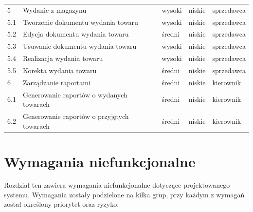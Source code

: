 \begin{table}[ht]
\begin{center}
\begin{tabular}{| l | l | l | l | l |}
		   	5 & Wydanie z magazynu & wysoki & niskie & sprzedawca \\
		   	5.1 & Tworzenie dokumentu wydania towaru & wysoki & niskie & sprzedawca \\
		   	5.2 & Edycja dokumentu wydania towaru & średni & niskie & sprzedawca \\
		   	5.3 & Usuwanie dokumentu wydania towaru & wysoki & niskie & sprzedawca \\
		   	5.4 & Realizacja wydania towaru & wysoki & niskie & sprzedawca \\
		   	5.5 & Korekta wydania towaru & średni & niskie & sprzedawca \\
		   	\hline
		   	6 & Zarządzanie raportami & średni & niskie & kierownik \\
		   	6.1 & Generowanie raportów o wydanych towarach & średni & niskie & kierownik \\
		   	6.2 & Generowanie raportów o przyjętych towarach & średni & niskie & kierownik \\
		   	\hline
	    \end{tabular}
	\end{center}
\end{table}
\FloatBarrier

\section{Wymagania niefunkcjonalne}

Rozdział ten zawiera wymagania niefunkcjonalne dotyczące projektowanego systemu.
Wymagania zostały podzielone na kilka grup, przy każdym z wymagań został
określony priorytet oraz ryzyko.

